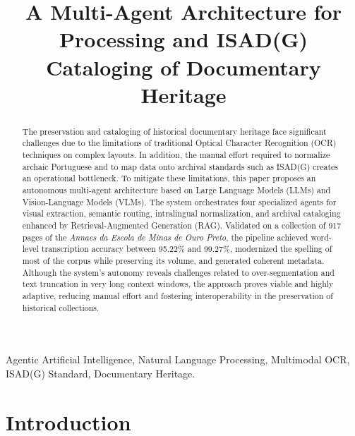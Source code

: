 \documentclass[conference]{IEEEtran}
\begin{document}
\title{A Multi-Agent Architecture for Processing and ISAD(G) Cataloging of Documentary Heritage}


\author{
}


\maketitle

\begin{abstract}
The preservation and cataloging of historical documentary heritage face significant challenges due to the limitations of traditional Optical Character Recognition (OCR) techniques on complex layouts. In addition, the manual effort required to normalize archaic Portuguese and to map data onto archival standards such as ISAD(G) creates an operational bottleneck. To mitigate these limitations, this paper proposes an autonomous multi-agent architecture based on Large Language Models (LLMs) and Vision-Language Models (VLMs). The system orchestrates four specialized agents for visual extraction, semantic routing, intralingual normalization, and archival cataloging enhanced by Retrieval-Augmented Generation (RAG). Validated on a collection of 917 pages of the \textit{Annaes da Escola de Minas de Ouro Preto}, the pipeline achieved word-level transcription accuracy between 95.22\% and 99.27\%, modernized the spelling of most of the corpus while preserving its volume, and generated coherent metadata. Although the system's autonomy reveals challenges related to over-segmentation and text truncation in very long context windows, the approach proves viable and highly adaptive, reducing manual effort and fostering interoperability in the preservation of historical collections.
\end{abstract}

\begin{IEEEkeywords}
Agentic Artificial Intelligence, Natural Language Processing, Multimodal OCR, ISAD(G) Standard, Documentary Heritage.
\end{IEEEkeywords}

\section{Introduction}
\end{document}
